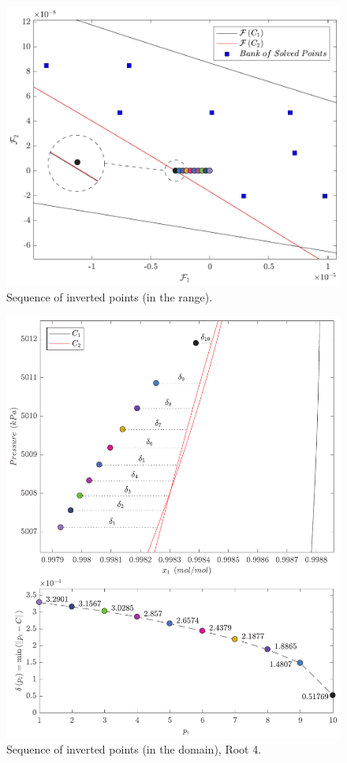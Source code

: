 \documentclass{article}
\theoremstyle{definition}
\theoremstyle{remark}
\begin{document}
\begin{figure}
	\begin{center}
		\includegraphics[scale=0.50]{imagem.pdf}
		\caption{Sequence of inverted points (in the range).}\label{fig:image_left}
	\end{center}
\end{figure}

\begin{figure}
	\begin{center}
		\includegraphics[scale=0.50]{dominio_distancias_novo.pdf}
		\caption{Sequence of inverted points (in the domain), Root 4.}\label{fig:domain_left}
	\end{center}
\end{figure}
\end{document}
